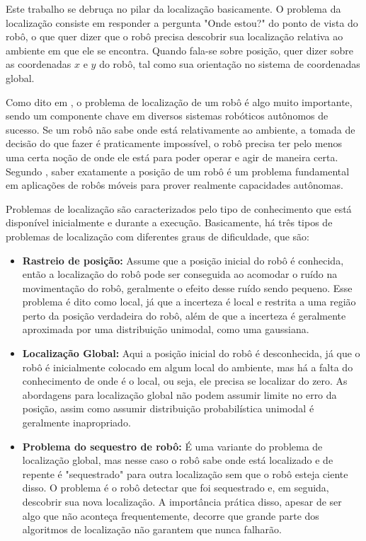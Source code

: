 \documentclass[acronym, symbols]{fei}
\begin{document}
			Este trabalho se debruça no pilar da localização basicamente. O problema da localização consiste em responder a pergunta "Onde estou?" do ponto de vista do robô, o que quer dizer que o robô precisa descobrir sua localização relativa ao ambiente em que ele se encontra. Quando fala-se sobre posição, quer dizer sobre as coordenadas $x$ e $y$ do robô, tal como sua orientação no sistema de coordenadas global.
			
			Como dito em \textcite{thrun2001robust}, o problema de localização de um robô é algo muito importante, sendo um componente chave em diversos sistemas robóticos autônomos de sucesso. Se um robô não sabe onde está relativamente ao ambiente, a tomada de decisão do que fazer é praticamente impossível, o robô precisa ter pelo menos uma certa noção de onde ele está para poder operar e agir de maneira certa. Segundo \textcite{borenstein1997mobile}, saber exatamente a posição de um robô é um problema fundamental em aplicações de robôs móveis para prover realmente capacidades autônomas.
			
			Problemas de localização são caracterizados pelo tipo de conhecimento que está disponível inicialmente e durante a execução. Basicamente, há três tipos de problemas de localização com diferentes graus de dificuldade, que são:
			
			\begin{itemize}
				\item \textbf{Rastreio de posição:} Assume que a posição inicial do robô é conhecida, então a localização do robô pode ser conseguida ao acomodar o ruído na movimentação do robô, geralmente o efeito desse ruído sendo pequeno. Esse problema é dito como local, já que a incerteza é local e restrita a uma região perto da posição verdadeira do robô, além de que a incerteza é geralmente aproximada por uma distribuição unimodal, como uma gaussiana.
				
				\item \textbf{Localização Global:} Aqui a posição inicial do robô é desconhecida, já que o robô é inicialmente colocado em algum local do ambiente, mas há a falta do conhecimento de onde é o local, ou seja, ele precisa se localizar do zero. As abordagens para localização global não podem assumir limite no erro da posição, assim como assumir distribuição probabilística unimodal é geralmente inapropriado.
				
				\item \textbf{Problema do sequestro de robô:} É uma variante do problema de localização global, mas nesse caso o robô sabe onde está localizado e de repente é "sequestrado" para outra localização sem que o robô esteja ciente disso. O problema é o robô detectar que foi sequestrado e, em seguida, descobrir sua nova localização. A importância prática disso, apesar de ser algo que não aconteça frequentemente, decorre que grande parte dos algoritmos de localização não garantem que nunca falharão.
			\end{itemize}
			
\end{document}
